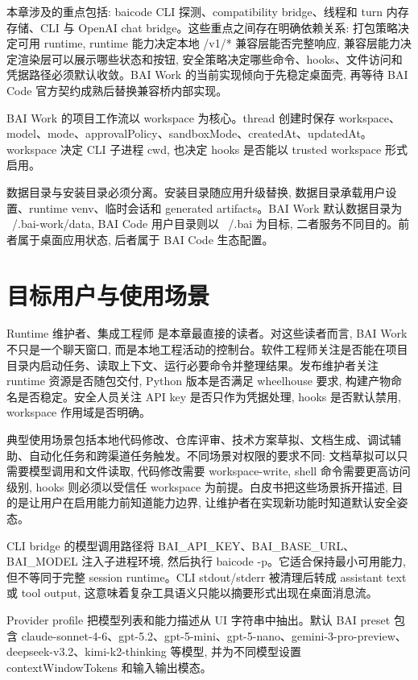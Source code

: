 本章涉及的重点包括: baicode CLI 探测、compatibility bridge、线程和 turn 内存存储、CLI 与 OpenAI chat bridge。这些重点之间存在明确依赖关系: 打包策略决定可用 runtime, runtime 能力决定本地 /v1/* 兼容层能否完整响应, 兼容层能力决定渲染层可以展示哪些状态和按钮, 安全策略决定哪些命令、hooks、文件访问和凭据路径必须默认收敛。BAI Work 的当前实现倾向于先稳定桌面壳, 再等待 BAI Code 官方契约成熟后替换兼容桥内部实现。

BAI Work 的项目工作流以 workspace 为核心。thread 创建时保存 workspace、model、mode、approvalPolicy、sandboxMode、createdAt、updatedAt。workspace 决定 CLI 子进程 cwd, 也决定 hooks 是否能以 trusted workspace 形式启用。

数据目录与安装目录必须分离。安装目录随应用升级替换, 数据目录承载用户设置、runtime venv、临时会话和 generated artifacts。BAI Work 默认数据目录为 ~/.bai-work/data, BAI Code 用户目录则以 ~/.bai 为目标, 二者服务不同目的。前者属于桌面应用状态, 后者属于 BAI Code 生态配置。

\section{目标用户与使用场景}
Runtime 维护者、集成工程师 是本章最直接的读者。对这些读者而言, BAI Work 不只是一个聊天窗口, 而是本地工程活动的控制台。软件工程师关注是否能在项目目录内启动任务、读取上下文、运行必要命令并整理结果。发布维护者关注 runtime 资源是否随包交付, Python 版本是否满足 wheelhouse 要求, 构建产物命名是否稳定。安全人员关注 API key 是否只作为凭据处理, hooks 是否默认禁用, workspace 作用域是否明确。

典型使用场景包括本地代码修改、仓库评审、技术方案草拟、文档生成、调试辅助、自动化任务和跨渠道任务触发。不同场景对权限的要求不同: 文档草拟可以只需要模型调用和文件读取, 代码修改需要 workspace-write, shell 命令需要更高访问级别, hooks 则必须以受信任 workspace 为前提。白皮书把这些场景拆开描述, 目的是让用户在启用能力前知道能力边界, 让维护者在实现新功能时知道默认安全姿态。

CLI bridge 的模型调用路径将 BAI\_API\_KEY、BAI\_BASE\_URL、BAI\_MODEL 注入子进程环境, 然后执行 baicode -p。它适合保持最小可用能力, 但不等同于完整 session runtime。CLI stdout/stderr 被清理后转成 assistant text 或 tool output, 这意味着复杂工具语义只能以摘要形式出现在桌面消息流。

Provider profile 把模型列表和能力描述从 UI 字符串中抽出。默认 BAI preset 包含 claude-sonnet-4-6、gpt-5.2、gpt-5-mini、gpt-5-nano、gemini-3-pro-preview、deepseek-v3.2、kimi-k2-thinking 等模型, 并为不同模型设置 contextWindowTokens 和输入输出模态。

